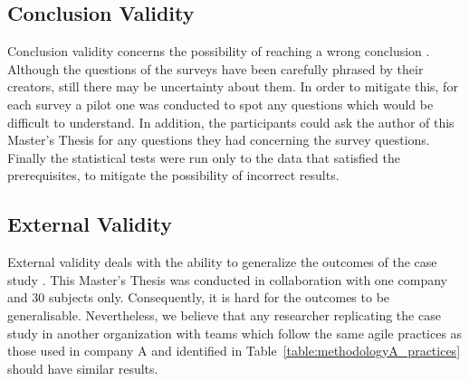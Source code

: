 



\subsection{Conclusion Validity}
Conclusion validity concerns the possibility of reaching a wrong conclusion \cite{Wohlin}. Although the questions of the surveys have been carefully phrased by their creators, still there may be uncertainty about them. In order to mitigate this, for each survey a pilot one was conducted to spot any questions which would be difficult to understand. In addition, the participants could ask the author of this Master's Thesis for any questions they had concerning the survey questions. Finally the statistical tests were run only to the data that satisfied the prerequisites, to mitigate the possibility of incorrect results. %

\subsection{External Validity}
External validity deals with the ability to generalize the outcomes of the case study \cite{Wohlin}. This Master's Thesis was conducted in collaboration with one company and 30 subjects only. Consequently, it is hard for the outcomes to be generalisable. Nevertheless, we believe that any researcher replicating the case study in another organization with teams which follow the same agile practices as those used in company A and identified in Table~\ref{table:methodologyA_practices} should have similar results.

